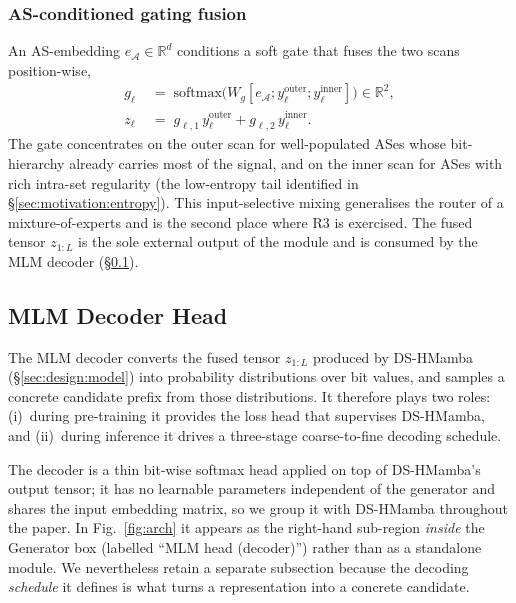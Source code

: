 \documentclass[conference]{IEEEtran}
\begin{document}
\subsubsection{AS-conditioned gating fusion}
An AS-embedding $e_{\mathcal{A}}\!\in\!\mathbb{R}^{d}$
conditions a soft gate that fuses the two scans position-wise,
\begin{equation}
\begin{aligned}
g_{\ell} \;&=\; \mathrm{softmax}\!\bigl(W_g[e_{\mathcal{A}};
   y^{\text{outer}}_{\ell};y^{\text{inner}}_{\ell}]\bigr)
   \in\mathbb{R}^{2},\\
z_{\ell} \;&=\; g_{\ell,1}\,y^{\text{outer}}_{\ell}
             + g_{\ell,2}\,y^{\text{inner}}_{\ell}.
\end{aligned}
\label{eq:gate}
\end{equation}
The gate concentrates on the outer scan for well-populated ASes
whose bit-hierarchy already carries most of the signal, and on
the inner scan for ASes with rich intra-set regularity (the
low-entropy tail identified in \S\ref{sec:motivation:entropy}).
This input-selective mixing generalises the router of a
mixture-of-experts and is the second place where R3 is
exercised.  The fused tensor $z_{1:L}$ is the sole external
output of the module and is consumed by the MLM decoder
(\S\ref{sec:design:decoder}).
\subsection{MLM Decoder Head}
\label{sec:design:decoder}
\label{sec:design:infer}
The MLM decoder converts the fused
tensor $z_{1:L}$ produced by DS-HMamba
(\S\ref{sec:design:model}) into probability distributions over
bit values, and samples a concrete candidate prefix from those
distributions.  It therefore plays two roles: (i)~during
pre-training it provides the loss head that supervises
DS-HMamba, and (ii)~during inference it drives a three-stage
coarse-to-fine decoding schedule.

The decoder is a thin bit-wise
softmax head applied on top of DS-HMamba's output tensor;
it has no learnable parameters independent of the generator
and shares the input embedding matrix, so we group it with
DS-HMamba throughout the paper.  In Fig.~\ref{fig:arch} it
appears as the right-hand sub-region \emph{inside} the
Generator box (labelled ``MLM head (decoder)'') rather than
as a standalone module.  We nevertheless retain a separate
subsection because the decoding \emph{schedule} it defines is
what turns a representation into a concrete candidate.
\end{document}
